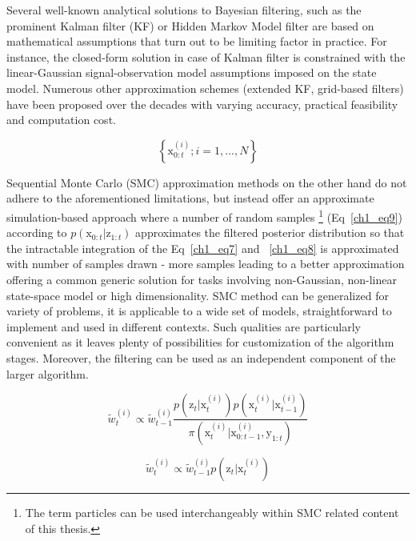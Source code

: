 Several well-known analytical solutions to Bayesian filtering, such as the prominent Kalman filter (KF) or Hidden Markov Model filter are based on mathematical assumptions that turn out to be limiting factor in practice. For instance, the closed-form solution in case of Kalman filter is constrained  with the linear-Gaussian signal-observation model assumptions imposed on the state model. Numerous other approximation schemes (extended KF, grid-based filters) have been proposed over the decades with varying accuracy, practical feasibility and computation cost. 

\begin{equation}
\left\lbrace \mathrm{x}_{0:t}^{(i)}; i = 1, ... , N \right\rbrace 
\label{ch1_eq9}
\end{equation}

Sequential Monte Carlo (SMC) approximation methods \cite{arulampalam2002tutorial} on the other hand do not adhere to the aforementioned limitations, but instead offer an approximate simulation-based approach where a number of random samples \footnote{The term particles can be used interchangeably within SMC related content of this thesis.} (Eq~\ref{ch1_eq9}) according to $p(\mathrm{x}_{0:t} | \mathrm{z}_{1:t})$ approximates the filtered posterior distribution so that the intractable integration of the Eq~\ref{ch1_eq7} and ~\ref{ch1_eq8} is approximated with number of samples drawn - more samples leading to a better approximation offering a common generic solution for tasks involving non-Gaussian, non-linear state-space model or high dimensionality. SMC method can be generalized for variety of problems, it is applicable to a wide set of models, straightforward to implement and used in different contexts. Such qualities are particularly convenient as it leaves plenty of possibilities for customization of the algorithm stages. Moreover, the filtering can be used as an independent component of the larger algorithm. 

\begin{equation}
\tilde{w}_{t}^{(i)} \propto \tilde{w}_{t-1}^{(i)} \frac{p(\mathrm{z}_t | \mathrm{x}_{t}^{(i)}) p(\mathrm{x}_{t}^{(i)} | \mathrm{x}_{t-1}^{(i)} )}{ \pi(\mathrm{x}_{t}^{(i)} | \mathrm{x}_{0:t-1}^{(i)}, \mathrm{y}_{1:t}) }
\label{ch1_eq10}
\end{equation}

\begin{equation}
\tilde{w}_{t}^{(i)} \propto \tilde{w}_{t-1}^{(i)} p(\mathrm{z}_t | \mathrm{x}_{t}^{(i)})
\label{ch1_eq11}
\end{equation}


